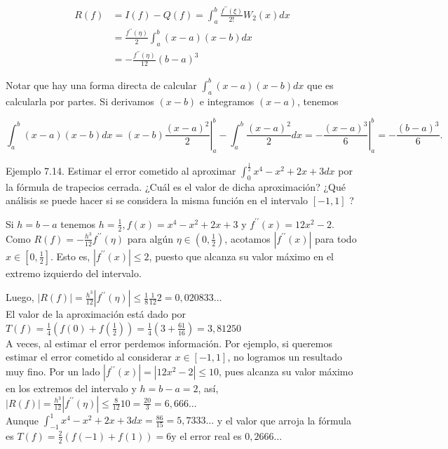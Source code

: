 \documentclass[10pt]{article}
\begin{document}
$$
\begin{aligned}
R(f) & =I(f)-Q(f)=\int_{a}^{b} \frac{f^{\prime \prime}(\xi)}{2!} W_{2}(x) d x \\
& =\frac{f^{\prime \prime}(\eta)}{2} \int_{a}^{b}(x-a)(x-b) d x \\
& =-\frac{f^{\prime \prime}(\eta)}{12}(b-a)^{3}
\end{aligned}
$$

Notar que hay una forma directa de calcular $\int_{a}^{b}(x-a)(x-b) d x$ que es calcularla por partes. Si derivamos $(x-b)$ e integramos $(x-a)$, tenemos

$$
\int_{a}^{b}(x-a)(x-b) d x=\left.(x-b) \frac{(x-a)^{2}}{2}\right|_{a} ^{b}-\int_{a}^{b} \frac{(x-a)^{2}}{2} d x=-\left.\frac{(x-a)^{3}}{6}\right|_{a} ^{b}=-\frac{(b-a)^{3}}{6} .
$$

Ejemplo 7.14. Estimar el error cometido al aproximar $\int_{0}^{\frac{1}{2}} x^{4}-x^{2}+2 x+3 d x$ por la fórmula de trapecios cerrada. ¿Cuál es el valor de dicha aproximación? ¿Qué análisis se puede hacer si se considera la misma función en el intervalo $[-1,1]$ ?

Si $h=b-a$ tenemos $h=\frac{1}{2}, f(x)=x^{4}-x^{2}+2 x+3$ y $f^{\prime \prime}(x)=12 x^{2}-2$. Como $R(f)=-\frac{h^{3}}{12} f^{\prime \prime}(\eta)$ para algún $\eta \in\left(0, \frac{1}{2}\right)$, acotamos $\left|f^{\prime \prime}(x)\right|$ para todo $x \in\left[0, \frac{1}{2}\right]$. Esto es, $\left|f^{\prime \prime}(x)\right| \leq 2$, puesto que alcanza su valor máximo en el extremo izquierdo del intervalo.

Luego, $|R(f)|=\frac{h^{3}}{12}\left|f^{\prime \prime}(\eta)\right| \leq \frac{1}{8} \frac{1}{12} 2=0,020833 \ldots$\\
El valor de la aproximación está dado por $T(f)=\frac{1}{4}\left(f(0)+f\left(\frac{1}{2}\right)\right)=\frac{1}{4}\left(3+\frac{61}{16}\right)=3,81250$\\
A veces, al estimar el error perdemos información. Por ejemplo, si queremos estimar el error cometido al considerar $x \in[-1,1]$, no logramos un resultado muy fino. Por un lado $\left|f^{\prime \prime}(x)\right|= \left|12 x^{2}-2\right| \leq 10$, pues alcanza su valor máximo en los extremos del intervalo y $h=b-a=2$, así,\\
$|R(f)|=\frac{h^{3}}{12}\left|f^{\prime \prime}(\eta)\right| \leq \frac{8}{12} 10=\frac{20}{3}=6,666 \ldots$\\
Aunque $\int_{-1}^{1} x^{4}-x^{2}+2 x+3 d x=\frac{86}{15}=5,7333 \ldots$ y el valor que arroja la fórmula es $T(f)= \frac{2}{2}(f(-1)+f(1))=6 \mathrm{y}$ el error real es $0,2666 \ldots$
\end{document}
